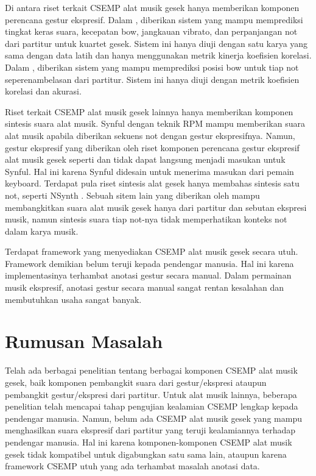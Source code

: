 Di antara riset terkait CSEMP alat musik gesek hanya memberikan komponen perencana gestur ekspresif. Dalam \parencite{marchini2014quartet}, diberikan sistem yang mampu memprediksi tingkat keras suara, kecepatan bow, jangkauan vibrato, dan perpanjangan not dari partitur untuk kuartet gesek. Sistem ini hanya diuji dengan satu karya yang sama dengan data latih dan hanya menggunakan metrik kinerja koefisien korelasi. Dalam \parencite{yu2017bowing}, diberikan sistem yang mampu memprediksi posisi bow untuk tiap not seperenambelasan dari partitur. Sistem ini hanya diuji dengan metrik koefisien korelasi dan akurasi.

Riset terkait CSEMP alat musik gesek lainnya hanya memberikan komponen sintesis suara alat musik. Synful dengan teknik RPM \parencite{lindemann2007rpm} mampu memberikan suara alat musik apabila diberikan sekuens not dengan gestur ekspresifnya. Namun, gestur ekspresif yang diberikan oleh riset komponen perencana gestur ekspresif alat musik gesek seperti \parencite{marchini2014quartet} dan \parencite{yu2017bowing} tidak dapat langsung menjadi masukan untuk Synful. Hal ini karena Synful didesain untuk menerima masukan dari pemain keyboard. Terdapat pula riset sintesis alat gesek hanya membahas sintesis satu not, seperti NSynth \parencite{nsynth2017}. Sebuah sitem lain yang diberikan oleh \parencite{yang2016synthesis} mampu membangkitkan suara alat musik gesek hanya dari partitur dan sebutan ekspresi musik, namun sintesis suara tiap not-nya tidak memperhatikan konteks not dalam karya musik.

Terdapat framework yang menyediakan CSEMP alat musik gesek secara utuh. \parencite{perez2015} Framework demikian belum teruji kepada pendengar manusia. Hal ini karena implementasinya terhambat anotasi gestur secara manual. Dalam permainan musik ekspresif, anotasi gestur secara manual sangat rentan kesalahan dan membutuhkan usaha sangat banyak.


\section{Rumusan Masalah}

Telah ada berbagai penelitian tentang berbagai komponen CSEMP alat musik gesek, baik komponen pembangkit suara dari gestur/ekspresi ataupun pembangkit gestur/ekspresi dari partitur. Untuk alat musik lainnya, beberapa penelitian telah mencapai tahap pengujian kealamian CSEMP lengkap kepada pendengar manusia. Namun, belum ada CSEMP alat musik gesek yang mampu menghasilkan suara ekspresif dari partitur yang teruji kealamiannya terhadap pendengar manusia. Hal ini karena komponen-komponen CSEMP alat musik gesek tidak kompatibel untuk digabungkan satu sama lain, ataupun karena framework CSEMP utuh yang ada terhambat masalah anotasi data.


